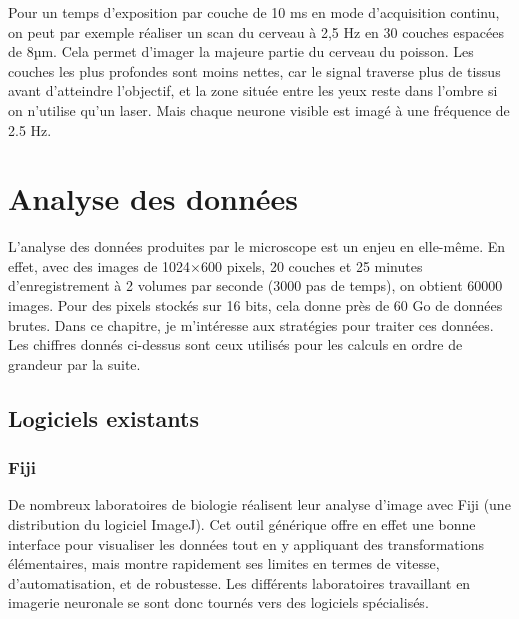 Pour un temps d'exposition par couche de 10 ms en mode d'acquisition continu, on peut par exemple réaliser un scan du cerveau à 2,5 Hz en 30 couches espacées de 8µm. Cela permet d'imager la majeure partie du cerveau du poisson. Les couches les plus profondes sont moins nettes, car le signal traverse plus de tissus avant d'atteindre l'objectif, et la zone située entre les yeux reste dans l'ombre si on n'utilise qu'un laser. Mais chaque neurone visible est imagé à une fréquence de 2.5 Hz.








\section{Analyse des données}

L'analyse des données produites par le microscope est un enjeu en elle-même. En effet, avec des images de 1024$\times$600 pixels, 20 couches et 25 minutes d'enregistrement à 2 volumes par seconde (3000 pas de temps), on obtient 60000 images. Pour des pixels stockés sur 16 bits, cela donne près de 60 Go de données brutes. Dans ce chapitre, je m'intéresse aux stratégies pour traiter ces données. Les chiffres donnés ci-dessus sont ceux utilisés pour les calculs en ordre de grandeur par la suite.

\subsection{Logiciels existants}

\subsubsection{Fiji}

De nombreux laboratoires de biologie réalisent leur analyse d'image avec Fiji (une distribution du logiciel ImageJ). Cet outil générique offre en effet une bonne interface pour visualiser les données tout en y appliquant des transformations élémentaires, mais montre rapidement ses limites en termes de vitesse, d'automatisation, et de robustesse. Les différents laboratoires travaillant en imagerie neuronale se sont donc tournés vers des logiciels spécialisés.

